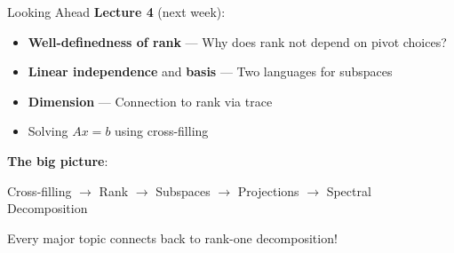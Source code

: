 \documentclass[10pt]{beamer}
\theoremstyle{definition}
\newcommand{\x}[1]{\alert{\textbf{#1}}}
\begin{document}
\begin{frame}{Looking Ahead}
\textbf{Lecture 4} (next week):
\begin{itemize}
\item \x{Well-definedness of rank} — Why does rank not depend on pivot choices?
\item \x{Linear independence} and \x{basis} — Two languages for subspaces
\item \x{Dimension} — Connection to rank via trace
\item Solving $Ax = b$ using cross-filling
\end{itemize}

\vfill
\textbf{The big picture}:
\begin{center}
Cross-filling $\to$ Rank $\to$ Subspaces $\to$ Projections $\to$ Spectral Decomposition
\end{center}

Every major topic connects back to rank-one decomposition!
\end{frame}
\end{document}
